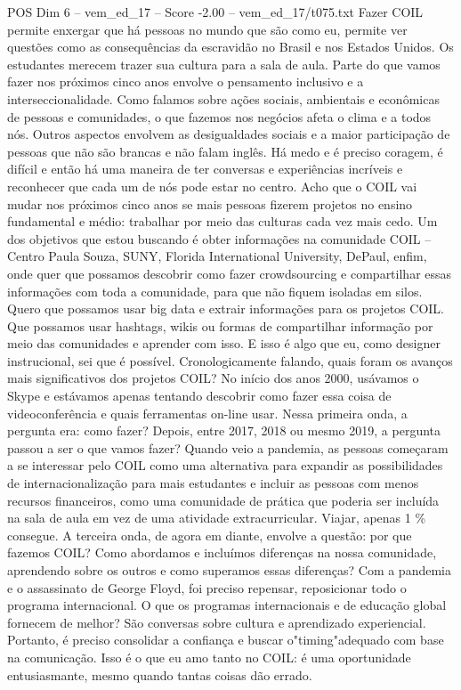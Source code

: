 \begin{textsample}{POS Dim 6 – vem\_ed\_17 – Score -2.00 – vem\_ed\_17/t075.txt}  \label{ex:f6_pos_044}
Fazer COIL permite enxergar que há pessoas no mundo que são como eu, permite ver questões como as consequências da escravidão no Brasil e nos Estados Unidos.
Os estudantes merecem trazer sua cultura para a sala de aula.
Parte do que vamos fazer nos próximos cinco anos envolve o pensamento inclusivo e a interseccionalidade.
Como falamos sobre ações sociais, ambientais e econômicas de pessoas e comunidades, o que fazemos nos negócios afeta o clima e a todos nós.
Outros aspectos envolvem as desigualdades sociais e a maior participação de pessoas que não são brancas e não falam inglês.
Há medo e é preciso coragem, é difícil e então há uma maneira de ter conversas e experiências incríveis e reconhecer que cada um de nós pode estar no centro.
Acho que o COIL vai mudar nos próximos cinco anos se mais pessoas fizerem projetos no ensino fundamental e médio: trabalhar por meio das culturas cada vez mais cedo.
Um dos objetivos que estou buscando é obter informações na comunidade COIL – Centro Paula Souza, SUNY, Florida International University, DePaul, enfim, onde quer que possamos descobrir como fazer crowdsourcing e compartilhar essas informações com toda a comunidade, para que não fiquem isoladas em silos.
Quero que possamos usar big data e extrair informações para os projetos COIL.
Que possamos usar hashtags, wikis ou formas de compartilhar informação por meio das comunidades e aprender com isso.
E isso é algo que eu, como designer instrucional, sei que é possível.
Cronologicamente falando, quais foram os avanços mais significativos dos projetos COIL?
No início dos anos 2000, usávamos o Skype e estávamos apenas tentando descobrir como fazer essa coisa de videoconferência e quais ferramentas on-line usar.
Nessa primeira onda, a pergunta era: como fazer?
Depois, entre 2017, 2018 ou mesmo 2019, a pergunta passou a ser o que vamos fazer?
Quando veio a pandemia, as pessoas começaram a se interessar pelo COIL como uma alternativa para expandir as possibilidades de internacionalização para mais estudantes e incluir as pessoas com menos recursos financeiros, como uma comunidade de prática que poderia ser incluída na sala de aula em vez de uma atividade extracurricular.
Viajar, apenas 1 \% consegue.
A terceira onda, de agora em diante, envolve a questão: por que fazemos COIL?
Como abordamos e incluímos diferenças na nossa comunidade, aprendendo sobre os outros e como superamos essas diferenças?
Com a pandemia e o assassinato de George Floyd, foi preciso repensar, reposicionar todo o programa internacional.
O que os programas internacionais e de educação global fornecem de melhor?
São conversas sobre cultura e aprendizado experiencial.
Portanto, é preciso consolidar a confiança e buscar o"timing"adequado com base na comunicação.
Isso é o que eu amo tanto no COIL: é uma oportunidade entusiasmante, mesmo quando tantas coisas dão errado.

\end{textsample}
